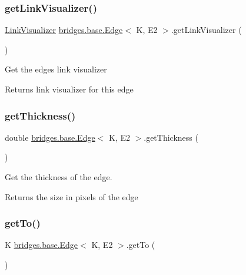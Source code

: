 \subsubsection{\texorpdfstring{getLinkVisualizer()}{getLinkVisualizer()}}
{\footnotesize\ttfamily \mbox{\hyperlink{classbridges_1_1base_1_1_link_visualizer}{Link\+Visualizer}} \mbox{\hyperlink{classbridges_1_1base_1_1_edge}{bridges.\+base.\+Edge}}$<$ K, E2 $>$.get\+Link\+Visualizer (\begin{DoxyParamCaption}{ }\end{DoxyParamCaption})}

Get the edge\textquotesingle{}s link visualizer \begin{DoxyReturn}{Returns}
link visualizer for this edge 
\end{DoxyReturn}
\mbox{\label{classbridges_1_1base_1_1_edge_a3431e83235fc5d5dd5cf747ed4853881}} 
\subsubsection{\texorpdfstring{getThickness()}{getThickness()}}
{\footnotesize\ttfamily double \mbox{\hyperlink{classbridges_1_1base_1_1_edge}{bridges.\+base.\+Edge}}$<$ K, E2 $>$.get\+Thickness (\begin{DoxyParamCaption}{ }\end{DoxyParamCaption})}



Get the thickness of the edge. 

\begin{DoxyReturn}{Returns}
the size in pixels of the edge 
\end{DoxyReturn}
\mbox{\label{classbridges_1_1base_1_1_edge_ab451c13aa8173b5ef1cc2b2dd4f8508f}} 
\subsubsection{\texorpdfstring{getTo()}{getTo()}}
{\footnotesize\ttfamily K \mbox{\hyperlink{classbridges_1_1base_1_1_edge}{bridges.\+base.\+Edge}}$<$ K, E2 $>$.get\+To (\begin{DoxyParamCaption}{ }\end{DoxyParamCaption})}



